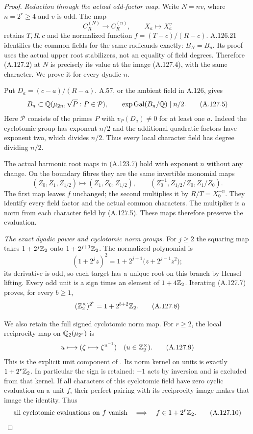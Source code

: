 \begin{proof}
\emph{Reduction through the actual odd-factor map.}
Write $N=nv$, where $n=2^r\ge4$ and $v$ is odd.
The map
\[
 C_R^{(N)}\longrightarrow C_R^{(n)},\qquad
                       X_a\longmapsto X_a^v
\tag{A.127.4}
\]
retains $T,R,c$ and the normalized function
$f=(T-c)/(R-c)$.
A.126.21 identifies the common fields for the same
radicands exactly: $B_N=B_n$.
Its proof uses the actual upper root stabilizers,
not an equality of field degrees.
Therefore (A.127.2) at $N$ is precisely its value
at the image (A.127.4), with the same character.
We prove it for every dyadic $n$.

Put $D_a=(c-a)/(R-a)$.
A.57, or the ambient field in A.126, gives
\[
B_n\subset\mathbb Q(\mu_{2n},\sqrt P:P\in\mathcal P),
 \qquad
              \operatorname{exp}\operatorname{Gal}(B_n/\mathbb Q)\mid n/2.
\tag{A.127.5}
\]
Here $\mathcal P$ consists of the primes $P$ with
$v_P(D_a)\ne0$ for at least one $a$.
Indeed the cyclotomic group has exponent $n/2$
and the additional quadratic factors have exponent
two, which divides $n/2$.
Thus every local character field has degree
dividing $n/2$.

The actual harmonic root maps in (A.123.7) hold
with exponent $n$ without any change.
On the boundary fibres they are the same
invertible monomial maps
\[
 (Z_0,Z_1,Z_{1/2})\longmapsto
 (Z_1,Z_0,Z_{1/2}),\qquad
 (Z_0^{-1},Z_{1/2}/Z_0,Z_1/Z_0).
\tag{A.127.6}
\]
The first map leaves $f$ unchanged; the second
multiplies it by $R/T=X_0^{-n}$.
They identify every field factor and the actual
common characters.
The multiplier is a norm from each character
field by (A.127.5).
These maps therefore preserve the evaluation.

\emph{The exact dyadic power and cyclotomic norm groups.}
For $j\ge2$ the squaring map takes
$1+2^j\mathbb Z_2$ onto $1+2^{j+1}\mathbb Z_2$.
The normalized polynomial is
\[
 (1+2^jz)^2
       =1+2^{j+1}\bigl(z+2^{j-1}z^2\bigr);
\tag{A.127.7}
\]
its derivative is odd, so each target has a unique
root on this branch by Hensel lifting.
Every odd unit is a sign times an element of
$1+4\mathbb Z_2$.
Iterating (A.127.7) proves, for every $b\ge1$,
\[
                    (\mathbb Z_2^\times)^{2^b}
                              =1+2^{b+2}\mathbb Z_2.
\tag{A.127.8}
\]

We also retain the full signed cyclotomic norm map.
For $r\ge2$, the local reciprocity map on
$\mathbb Q_2(\mu_{2^r})$ is
\[
       u\longmapsto(\zeta\longmapsto\zeta^{u^{-1}})
                                      \quad(u\in\mathbb Z_2^\times).
\tag{A.127.9}
\]
This is the explicit unit component of
\cite[Theorem 4.1.2 and Example 4.1.4]{BIR_KedlayaCFT}.
Its norm kernel on units is exactly
$1+2^r\mathbb Z_2$.
In particular the sign is retained: $-1$ acts
by inversion and is excluded from that kernel.
If all characters of this cyclotomic field have
zero cyclic evaluation on a unit $f$, their
perfect pairing with its reciprocity image makes
that image the identity.
Thus
\[
 \text{all cyclotomic evaluations on }f\text{ vanish}
        \quad\Longrightarrow\quad f\in1+2^r\mathbb Z_2.
\tag{A.127.10}
\]


\end{proof}

